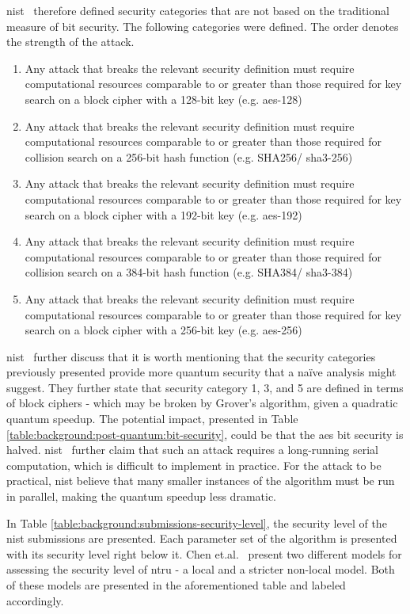 \gls{nist}~\cite{nist2017} therefore defined security categories that are not based on the traditional measure of bit security. The following categories were defined. The order denotes the strength of the attack.

\begin{enumerate}
    \item Any attack that breaks the relevant security definition must require computational resources comparable to or greater than those required for key search on a block cipher with a 128-bit key (e.g. \gls{aes}-128)
    \item Any attack that breaks the relevant security definition must require computational resources comparable to or greater than those required for collision search on a 256-bit hash function (e.g. SHA256/ \gls{sha3}-256)
    \item Any attack that breaks the relevant security definition must require computational resources comparable to or greater than those required for key search on a block cipher with a 192-bit key (e.g. \gls{aes}-192)
    \item Any attack that breaks the relevant security definition must require computational resources comparable to or greater than those required for collision search on a 384-bit hash function (e.g. SHA384/ \gls{sha3}-384)
    \item Any attack that breaks the relevant security definition must require computational resources comparable to or greater than those required for key search on a block cipher with a 256-bit key (e.g. \gls{aes}-256)
\end{enumerate}

\noindent \gls{nist}~\cite{nist2017} further discuss that it is worth mentioning that the security categories previously presented provide more quantum security that a naïve analysis might suggest. They further state that security category 1, 3, and 5 are defined in terms of block ciphers - which may be broken by Grover's algorithm, given a quadratic quantum speedup. The potential impact, presented in Table \ref{table:background:post-quantum:bit-security}, could be that the \gls{aes} bit security is halved. \gls{nist}~\cite{nist2017} further claim that such an attack requires a long-running serial computation, which is difficult to implement in practice. For the attack to be practical, \gls{nist} believe that many smaller instances of the algorithm must be run in parallel, making the quantum speedup less dramatic.

In Table \ref{table:background:submissions-security-level}, the security level of the \gls{nist} submissions are presented. Each parameter set of the algorithm is presented with its security level right below it. Chen et.al.~\cite{ntru2020} present two different models for assessing the security level of \gls{ntru} - a local and a stricter non-local model. Both of these models are presented in the aforementioned table and labeled accordingly.

